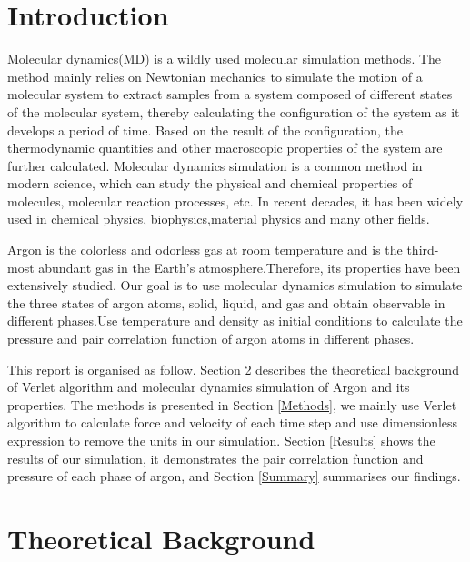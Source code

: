 \documentclass[a4paper,12pt]{article} %
\begin{document}
\section{Introduction} %
Molecular dynamics(MD) is a wildly used molecular simulation methods. The method mainly relies on Newtonian mechanics to simulate the motion of a molecular system to extract samples from a system composed of different states of the molecular system, thereby calculating the configuration of the system as it develops a period of time. Based on the result of the configuration, the thermodynamic quantities and other macroscopic properties of the system are further calculated. Molecular dynamics simulation is a common method in modern science, which can study the physical and chemical properties of molecules, molecular reaction processes, etc. In recent decades, it has been widely used in chemical physics\cite{suleimanov2011bimolecular}, biophysics\cite{vsponer2007molecular}\cite{lague2004pressure},material physics\cite{novko2015ab} and many other fields.\par
Argon is the colorless and odorless gas at room temperature and is the third-most abundant gas in the Earth's atmosphere.Therefore, its properties have been extensively studied. Our goal is to use molecular dynamics simulation to simulate the three states of argon atoms, solid, liquid, and gas and obtain observable in different phases.Use temperature and density as initial conditions to calculate the pressure and pair correlation function of argon atoms in different phases.\par
This report is organised as follow. Section \ref{Theoretical Background} describes the theoretical background of Verlet algorithm and molecular dynamics simulation of Argon and its properties. The methods is presented in Section \ref{Methods}, we mainly use Verlet algorithm to calculate force and velocity of each time step and use dimensionless expression to remove the units in our simulation. Section \ref{Results} shows the results of our simulation, it demonstrates the pair correlation function and pressure of each phase of argon, and Section \ref{Summary} summarises our findings.\par

\newpage
\section{Theoretical Background}
\label{Theoretical Background}
\end{document}
